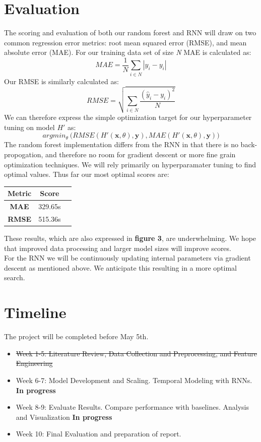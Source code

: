 \documentclass[sigconf]{acmart}
\begin{document}
\section{Evaluation}
The scoring and evaluation of both our random forest and RNN will draw on two common regression error metrics: root mean squared error (RMSE), and mean absolute error (MAE). For our training data set of size \textit{N} MAE is calculated as:\\
$$MAE = \frac{1}{N} \sum_{i \in N} |\hat{y}_i - y_i|$$
Our RMSE is similarly calculated as:
$$RMSE = \sqrt{\sum_{i\in N}\frac{(\hat{y}_i - y_i)^2}{N}}$$
We can therefore express the simple optimization target for our hyperparameter tuning on model $H'$ as:
$$argmin_\theta \ \big(RMSE (H'(\textbf{x}, \theta), \textbf{y}), MAE(H'(\textbf{x}, \theta), \textbf{y}) \big) $$
The random forest implementation differs from the RNN in that there is no back-propogation, and therefore no room for gradient descent or more fine grain optimization techniques. We will rely primarily on hyperparamater tuning to find optimal values. Thus far our most optimal scores are: 

\begin{table}[h]
    \centering
    \label{Random Forest Error}
    \begin{tabular}{ccc}
        \toprule
        \textbf{Metric} & \textbf{Score} \\
        \midrule
        \textbf{MAE} & 329.65s  \\
        \textbf{RMSE} & 515.36s  \\
        \bottomrule
    \end{tabular}
\end{table}
These results, which are also expressed in \textbf{figure 3}, are underwhelming. We hope that improved data processing and larger model sizes will improve scores.\\
For the RNN we will be continuously updating internal parameters via gradient descent as mentioned above. We anticipate this resulting in a more optimal search.

\section{Timeline}
The project will be completed before May 5th.
\begin{itemize}
    \item \st{Week 1-5:
    Literature Review, Data Collection and Preprocessing, and Feature Engineering}
    \item Week 6-7: Model Development and Scaling. Temporal Modeling with RNNs. \textbf{In progress}
    \item Week 8-9: Evaluate Results. Compare performance with baselines. Analysis and Visualization \textbf{In progress}
    \item Week 10: Final Evaluation and preparation of report.

\end{itemize}
\end{document}
